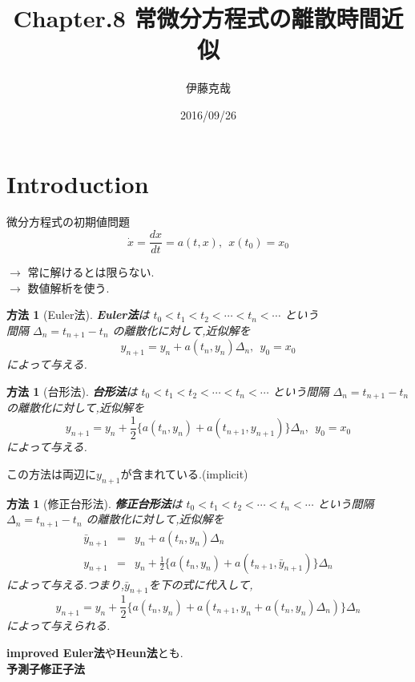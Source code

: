 \documentclass[dvipdfmx,cjk]{beamer}
\numberwithin{equation}{section}
\newtheorem{Method}[Thm]{方法}
\def\method{\begin{Method}}
\def\methodx{\end{Method}}
\def\eq{\begin{equation}}
\def\eqx{\end{equation}}
\def\eqa{\begin{eqnarray}}
\def\eqax{\end{eqnarray}}
\begin{document}
\title[Chap8]{Chapter.8 常微分方程式の離散時間近似} 
\author[Katsuya ITO]{伊藤克哉} 
\date{2016/09/26}

\begin{frame}
\titlepage    
\end{frame}
\begin{frame}
\tableofcontents
\end{frame}
\section{Introduction}
\begin{frame}
\begin{block}{微分方程式の初期値問題}
\[
\dot{x} = \frac{dx}{dt} = a(t,x), \  \  x(t_0) = x_0
\]
\end{block}

$\to$ 常に解けるとは限らない.\\
$\to$ 数値解析を使う.
\end{frame}

\begin{frame}

\method[Euler法]
{\bf Euler法}は $ t_0 < t_1 < t_2 < \cdots < t_n < \cdots $ という\\
間隔 $\Delta_n = t_{n+1} - t_{n}$ の離散化に対して,近似解を
\eq
\label{eq2}
y_{n+1} = y_n + a(t_n,y_n)\Delta_n,\  \  y_0 = x_0
\eqx
によって与える.
\methodx
\end{frame}

\begin{frame}

\method[台形法]
{\bf 台形法}は $ t_0 < t_1 < t_2 < \cdots < t_n < \cdots $ という間隔 $\Delta_n = t_{n+1} - t_{n}$ の離散化に対して,近似解を
\eq
\label{eq3}
y_{n+1} = y_n + \frac{1}{2} \{ a(t_n,y_n) + a(t_{n+1},y_{n+1}) \} \Delta_n,\  \  y_0 = x_0
\eqx
によって与える.
\methodx
この方法は両辺に$y_{n+1}$が含まれている.(implicit)
\end{frame}

\begin{frame}
\method[修正台形法]
{\bf 修正台形法}は $ t_0 < t_1 < t_2 < \cdots < t_n < \cdots $ という間隔 $\Delta_n = t_{n+1} - t_{n}$ の離散化に対して,近似解を
\eqa
\label{eq4}
\bar{y}_{n+1} &=& y_n + a(t_n,y_n)\Delta_n  \\
\label{eq5}
y_{n+1} &=& y_n + \frac{1}{2} \{ a(t_n,y_n) + a(t_{n+1},\bar{y}_{n+1}) \} \Delta_n 
\eqax
によって与える.つまり,$\bar{y}_{n+1}$を下の式に代入して,
\eq
\label{eq6}
y_{n+1} = y_n + \frac{1}{2} \{ a(t_n,y_n) + a(t_{n+1},y_n + a(t_n,y_n)\Delta_n) \} \Delta_n
\eqx
によって与えられる.
\methodx
{\bf improved Euler法}や{\bf Heun法}とも.\\
{\bf 予測子修正子法}
\end{frame}
\end{document}
